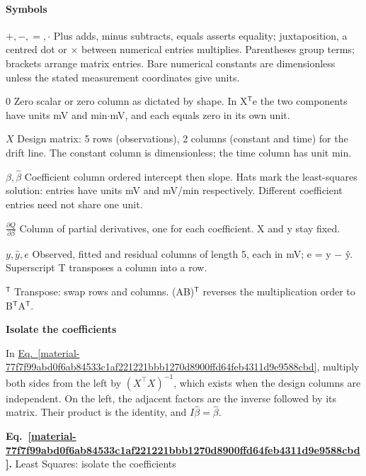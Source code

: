 \documentclass[11pt,a4paper]{article}
\begin{document}
\paragraph{Symbols}
\par\noindent\textbf{\(+,-,=,\cdot\)} Plus adds, minus subtracts, equals asserts equality; juxtaposition, a centred dot or \ensuremath{\times} between numerical entries multiplies. Parentheses group terms; brackets arrange matrix entries. Bare numerical constants are dimensionless unless the stated measurement coordinates give units.
\par\noindent\textbf{\(0\)} Zero scalar or zero column as dictated by shape. In X\ensuremath{{}^{\mathsf T}}e the two components have units mV and min\ensuremath{\cdot}mV, and each equals zero in its own unit.
\par\noindent\textbf{\(X\)} Design matrix: 5 rows (observations), 2 columns (constant and time) for the drift line. The constant column is dimensionless; the time column has unit min.
\par\noindent\textbf{\(\beta,\widehat\beta\)} Coefficient column ordered intercept then slope. Hats mark the least-squares solution: entries have units mV and mV/min respectively. Different coefficient entries need not share one unit.
\par\noindent\textbf{\(\frac{\partial Q}{\partial\beta}\)} Column of partial derivatives, one for each coefficient. X and y stay fixed.
\par\noindent\textbf{\(y,\widehat y,e\)} Observed, fitted and residual columns of length 5, each in mV; e = y \ensuremath{-} ŷ. Superscript T transposes a column into a row.
\par\noindent\textbf{\({}^{\mathsf T}\)} Transpose: swap rows and columns. (AB)\ensuremath{{}^{\mathsf T}} reverses the multiplication order to B\ensuremath{{}^{\mathsf T}}A\ensuremath{{}^{\mathsf T}}.
\medskip

\textbf{Isolate the coefficients}


In \hyperref[material-77f7f99abd0f6ab84533c1af221221bbb1270d8900ffd64feb4311d9e9588cbd]{Eq.~\ref*{material-77f7f99abd0f6ab84533c1af221221bbb1270d8900ffd64feb4311d9e9588cbd}}, multiply both sides from the left by \((X^\top X)^{-1}\), which exists when the design columns are independent. On the left, the adjacent factors are the inverse followed by its matrix. Their product is the identity, and \(I\widehat\beta=\widehat\beta\).


\par\medskip
{}
\label{material-77f7f99abd0f6ab84533c1af221221bbb1270d8900ffd64feb4311d9e9588cbd}
\noindent\textbf{Eq.~\ref*{material-77f7f99abd0f6ab84533c1af221221bbb1270d8900ffd64feb4311d9e9588cbd}.} Least Squares: isolate the coefficients\par\nopagebreak
\end{document}
